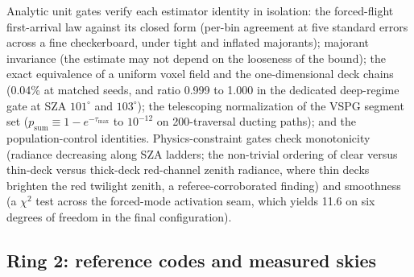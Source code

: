 \documentclass[preprint,12pt]{elsarticle}
\begin{document}
Analytic unit gates verify each estimator identity in isolation: the
forced-flight first-arrival law against its closed form (per-bin agreement
at five standard errors across a fine checkerboard, under tight and
inflated majorants); majorant invariance (the estimate may not depend on
the looseness of the bound); the exact equivalence of a uniform voxel
field and the one-dimensional deck chains (0.04\% at matched seeds, and
ratio 0.999 to 1.000 in the dedicated deep-regime gate at SZA $101^\circ$
and $103^\circ$); the telescoping normalization of the VSPG segment set
($p_{\mathrm{sum}} \equiv 1-e^{-\tau_{\max}}$ to $10^{-12}$ on
200-traversal ducting paths); and the population-control identities.
Physics-constraint gates check monotonicity (radiance decreasing along
SZA ladders; the non-trivial ordering of clear versus thin-deck versus
thick-deck red-channel zenith radiance, where thin decks brighten the red
twilight zenith, a referee-corroborated finding) and smoothness (a
$\chi^2$ test across the forced-mode activation seam, which yields 11.6
on six degrees of freedom in the final configuration).

\subsection{Ring 2: reference codes and measured skies}
\label{sec:ring2}
\end{document}
